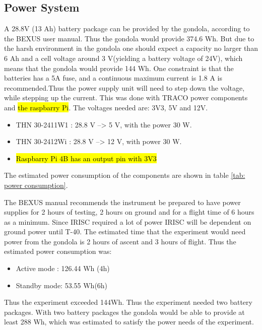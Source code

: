 \pagebreak
\subsection{Power System}

\label{sec:4.7}

A 28.8V (13 Ah) battery package can be provided by the gondola, according to the BEXUS user manual. Thus the gondola would provide 374.6 Wh. But due to the harsh environment in the gondola one should expect a capacity no larger than 6 Ah and a cell voltage around 3 V(yielding a battery voltage of 24V), which means that the gondola would provide 144 Wh. One constraint is that the batteries has a 5A fuse, and a continuous maximum current is 1.8 A is recommended.Thus the power supply unit will need to step down the voltage, while stepping up the current. This was done with TRACO power components and \hl{the raspbarry Pi}. The voltages needed are: 3V3, 5V and 12V.

\begin{itemize}
	\item THN 30-2411W1 : 28.8 V --> 5 V, with the power 30 W.
	\item THN 30-2412Wi : 28.8 V --> 12 V, with power 30 W.
	\item \hl{Raspbarry Pi 4B has an output pin with 3V3}
\end{itemize}


The estimated power consumption of the components are shown in table \ref{tab: power consumption}.



The BEXUS manual recommends the instrument be prepared to have power supplies for 2 hours of testing, 2 hours on ground and for a flight time of 6 hours as a minimum. Since IRISC required a lot of power IRISC will be dependent on ground power  until T-40. The estimated time that the experiment would need power from the gondola is 2 hours of ascent and 3 hours of flight. Thus the estimated power consumption was:  

\begin{itemize}
    \item Active mode : 126.44 Wh (4h) 
    \item Standby mode: 53.55 Wh(6h)
\end{itemize}

Thus the experiment exceeded 144Wh. Thus the experiment needed two battery packages. With two battery packages the gondola would be able to provide at least 288 Wh, which was estimated to satisfy the power needs of the experiment.



\raggedbottom

